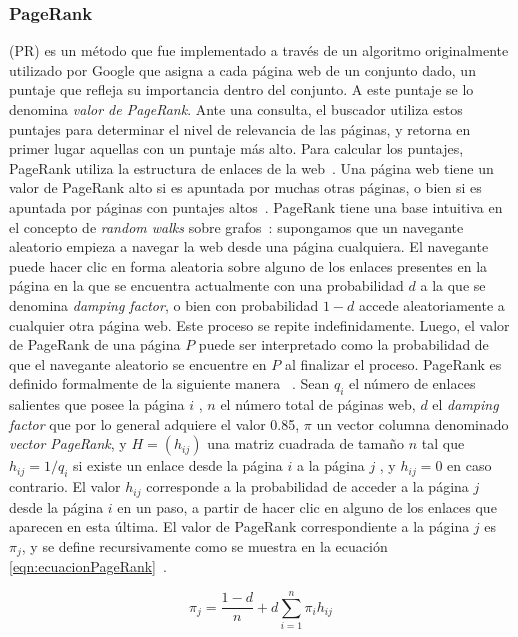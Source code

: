 \subsubsection{PageRank}
(PR) es un método que fue implementado a través de un algoritmo
originalmente utilizado por Google que asigna a cada página web de un conjunto dado, un puntaje que refleja su importancia dentro del conjunto. A este puntaje se lo denomina \textit{valor de PageRank}. Ante una consulta, el buscador utiliza estos puntajes para determinar el nivel de relevancia de las páginas, y retorna en primer lugar aquellas con un puntaje más alto. Para calcular los puntajes, PageRank utiliza la estructura de enlaces de la web~\cite{brin1998anatomy}. Una página web tiene un valor de PageRank alto si es apuntada por muchas otras páginas, o bien si es apuntada por páginas con puntajes altos~\cite{page1999pagerank}. PageRank tiene una base intuitiva en el concepto de \textit{random walks} sobre grafos~\cite{gobel1974random}: supongamos que un navegante aleatorio empieza a navegar la web desde una página cualquiera. El navegante puede hacer clic en forma aleatoria sobre alguno de los enlaces presentes en la página en la que se encuentra actualmente con una probabilidad $d$ a la que se denomina \textit{damping factor}, o bien con probabilidad $1-d$ accede aleatoriamente a cualquier otra página web. Este proceso se repite indefinidamente. Luego, el valor de PageRank de una página $P$ puede ser interpretado como la probabilidad de que el navegante aleatorio se encuentre en $P$ al finalizar el proceso. PageRank es definido formalmente de la siguiente manera ~\cite{franceschet2011pagerank}. Sean $q_i$ el número de enlaces salientes que posee la página $i$ , $n$ el número total de páginas web, $d$ el \textit{damping factor} que por lo general adquiere el valor 0.85, $\pi$ un vector columna denominado \textit{vector PageRank}, y $H = (h_{ij})$ una matriz cuadrada de tamaño $n$ tal que $h_{ij} = 1/q_i$ si existe un enlace desde la página $i$ a la página $j$ , y $h_{ij} = 0$ en caso contrario. El valor $h_{ij}$ corresponde a la probabilidad de acceder a la página $j$ desde la página $i$ en un paso, a partir de hacer clic en alguno de los enlaces que aparecen en esta última. El valor de PageRank correspondiente a la página $j$ es $\pi_j$, y se define recursivamente como se muestra en la ecuación \ref{eqn:ecuacionPageRank}~\cite{lin2010data}.

\begin{equation} 
	\label{eqn:ecuacionPageRank} 
	\pi_j = \frac{1-d}{n} + d \sum_{i=1}^{n} \pi_i h_{ij} 
\end{equation}


